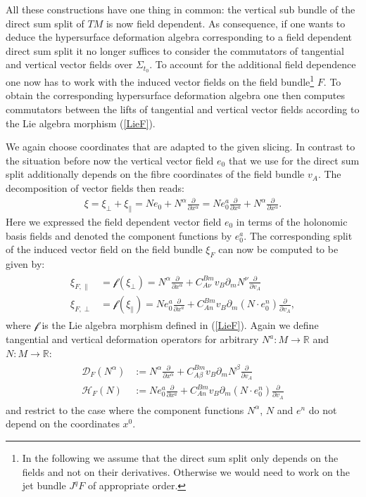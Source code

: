 \documentclass[a4paper,12pt, DIV=14, BCOR=5mm, twoside, headsepline]{scrbook}
\begin{document}
All these constructions have one thing in common: the vertical sub bundle of the direct sum split of $TM$ is now field dependent. As consequence, if one wants to deduce the hypersurface deformation algebra corresponding to a field dependent direct sum split it no longer suffices to consider the commutators of tangential and vertical vector fields over $\Sigma_{t_0}$. To account for the additional field dependence one now has to work with the induced vector fields on the field bundle\footnote{In the following we assume that the direct sum split only depends on the fields and not on their derivatives. Otherwise we would need to work on the jet bundle $J^qF$ of appropriate order.} $F$. To obtain the corresponding hypersurface deformation algebra one then computes commutators between the lifts of tangential and vertical vector fields according to the Lie algebra morphism (\ref{LieF}).

We again choose coordinates that are adapted to the given slicing. In contrast to the situation before now the vertical vector field $e_0$ that we use for the direct sum split additionally depends on the fibre coordinates of the field bundle $v_A$. The decomposition of vector fields then reads:
\begin{align}
    \xi = \xi_{\perp} + \xi_{\parallel} = N e_0 + N^{\alpha} \frac{\partial }{\partial x^{\alpha}} = N  e_0^a \frac{\partial}{\partial x^a} + N^{\alpha} \frac{\partial }{\partial x^{\alpha}}.
\end{align}
Here we expressed the field dependent vector field $e_0$ in terms of the holonomic basis fields and denoted the component functions by $e_0^a$.
The corresponding split of the induced vector field on the field bundle $\xi_F$ can now be computed to be given by:
\begin{align}
    \begin{aligned}
    \xi_{F,\parallel} &= \mathcal{f} \left ( \xi_{\perp} \right ) = N^{\alpha} \frac{\partial}{\partial x^{\alpha}} + C_{A \nu}^{B m} v_B \partial_{m} N^{\nu} \frac{\partial}{\partial v_A} \\
    \xi_{F, \perp} &= \mathcal{f} \left ( \xi_{\parallel} \right )=  N e_0^a \frac{\partial}{\partial x^a} + C_{A n}^{B m} v_B \partial_{m} (N \cdot e_0^n) \frac{\partial}{\partial v_A},
    \end{aligned}
\end{align}
where $\mathcal{f}$ is the Lie algebra morphism defined in (\ref{LieF}).
Again we define tangential and vertical deformation operators for arbitrary $N^a : M \rightarrow \mathbb{R}$ and $N : M \rightarrow \mathbb{R}$:
\begin{align}
    \begin{aligned}
    \mathcal{D}_F(N^{\alpha})&:= N^{\alpha} \frac{\partial}{\partial x^{\alpha}} + C_{A \beta}^{B m} v_B \partial_{m} N^{\beta} \frac{\partial}{\partial v_A} \\
    \mathcal{H}_F(N) &:=  N e_0^a \frac{\partial}{\partial x^a} + C_{A n}^{B m} v_B \partial_{m} (N \cdot e_0^n) \frac{\partial}{\partial v_A}
    \end{aligned}
\end{align}
and restrict to the case where the component functions $N^{\alpha}$, $N$ and $e^n$ do not depend on the coordinates $x^0$.
\end{document}
